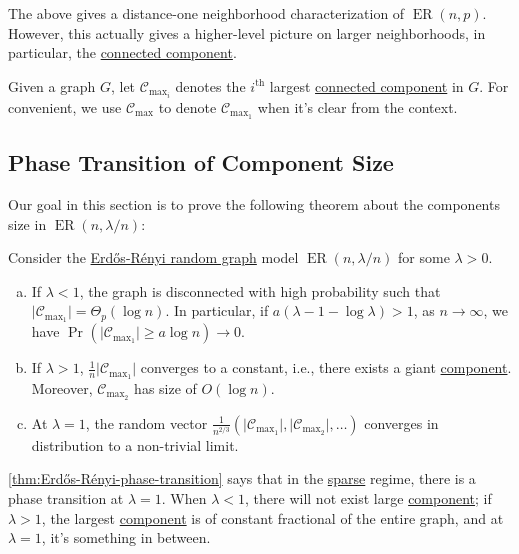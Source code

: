 The above gives a distance-one neighborhood characterization of \(\operatorname{ER}(n, p)\). However, this actually gives a higher-level picture on larger neighborhoods, in particular, the \hyperref[def:connected-component]{connected component}.

\begin{notation}
	Given a graph \(G\), let \(\mathcal{C} _{\max _i}\) denotes the \(i^{\text{th} }\) largest \hyperref[def:connected-component]{connected component} in \(G\). For convenient, we use \(\mathcal{C} _{\max }\) to denote \(\mathcal{C} _{\max _1}\) when it's clear from the context.
\end{notation}

\subsection{Phase Transition of Component Size}
Our goal in this section is to prove the following theorem about the components size in \(\operatorname{ER}(n, \lambda / n) \):

\begin{theorem}\label{thm:Erdős-Rényi-phase-transition}
	Consider the \hyperref[def:Erdős-Rényi-random-graph]{Erdős-Rényi random graph} model \(\operatorname{ER}(n, \lambda / n)\) for some \(\lambda > 0\).
	\begin{enumerate}[(a)]
		\item\label{thm:Erdős-Rényi-phase-transition-a} If \(\lambda < 1\), the graph is disconnected with high probability such that \(\lvert \mathcal{C} _{\max _1} \rvert = \Theta _p (\log n)\). In particular, if \(a (\lambda - 1 - \log \lambda ) > 1\), as \(n \to \infty \), we have \(\Pr_{}\left( \lvert \mathcal{C} _{\max _1} \rvert \geq  a \log n \right) \to 0\).
		\item\label{thm:Erdős-Rényi-phase-transition-b} If \(\lambda > 1\), \(\frac{1}{n} \lvert \mathcal{C} _{\max _1} \rvert \) converges to a constant, i.e., there exists a giant \hyperref[def:connected-component]{component}. Moreover, \(\mathcal{C} _{\max _2}\) has size of \(O(\log n)\).
		\item\label{thm:Erdős-Rényi-phase-transition-c} At \(\lambda = 1\), the random vector \(\frac{1}{n^{2 / 3}} (\lvert \mathcal{C} _{\max _1} \rvert , \lvert \mathcal{C} _{\max _2} \rvert , \dots )\) converges in distribution to a non-trivial limit.
	\end{enumerate}
\end{theorem}

\autoref{thm:Erdős-Rényi-phase-transition} says that in the \hyperref[def:sparse-graph]{sparse} regime, there is a phase transition at \(\lambda = 1\). When \(\lambda < 1\), there will not exist large \hyperref[def:connected-component]{component}; if \(\lambda > 1\), the largest \hyperref[def:connected-component]{component} is of constant fractional of the entire graph, and at \(\lambda = 1\), it's something in between.

